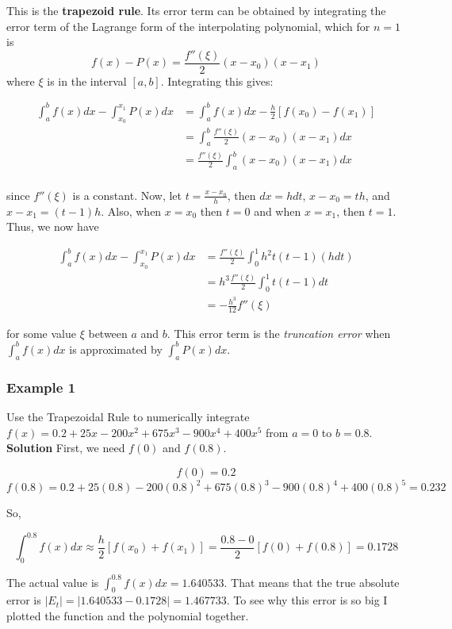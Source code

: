 \documentclass [titlepage,12pt,letter] {article}
\begin{document}
This is the {\bf trapezoid rule}. Its error term can be obtained by integrating the error term of the Lagrange form of the interpolating polynomial, which for $n=1$ is 
\[
f(x) - P(x) = \frac{f''(\xi)}{2}(x-x_0)(x-x_1) 
\]
\noindent 
\noindent 
where $\xi$ is in the interval $[a,b]$.
Integrating this gives: 

\begin{align*} 
\int_a^{b} f(x) dx - \int_{x_0}^{x_1} P(x)dx &= \int_a^{b} f(x) dx - \frac{h}{2} [ f(x_0) - f(x_1)] \\
&= \int_{a}^{b} \frac{f''(\xi)}{2}(x-x_0)(x-x_1)dx  \\
&= \frac{f''(\xi)}{2} \int_{a}^{b} (x-x_0)(x-x_1)dx \\ 
\end{align*} 

\noindent
since $f''(\xi)$ is a constant. Now, let $t = \frac{x-x_0}{h}$, then $dx=hdt$, $x - x_0 = th$, and $x - x_1 = (t-1) h$. 
Also, when $x=x_0$ then $t = 0$ and when $x = x_1$, then $t=1$. Thus, we now have

\begin{align*} 
\int_a^{b} f(x) dx - \int_{x_0}^{x_1} P(x)dx &= \frac{f''(\xi)}{2}\int_{0}^{1} h^2t(t-1)(hdt) \\
&= h^3 \frac{f''(\xi)}{2} \int_0^{1} t(t-1)dt \\ 
&= - \frac{h^3}{12}f''(\xi)
\end{align*} 

\noindent
for some value $\xi$ between $a$ and  $b$. This error term is the {\it truncation error} when $\int_a^b f(x) dx$ is approximated by $\int_a^{b} P(x)dx$. 

\subsubsection{Example 1} 

Use the Trapezoidal Rule to numerically integrate $f(x)=0.2+25x-200x^2+675x^3-900x^4+400x^5$ from $a=0$ to $b=0.8$. \\

{\bf Solution}
First, we need $f(0)$ and $f(0.8)$.

\[
f(0)=0.2
\]\[
f(0.8)=0.2+25(0.8)-200(0.8)^2+675(0.8)^3-900(0.8)^4+400(0.8)^5 = 0.232
\]

So,

\[
\int_0^{0.8}f(x)dx \approx \frac{h}{2}[f(x_0)+f(x_1)] = \frac{0.8-0}{2}[f(0)+f(0.8)] = 0.1728
\]

The actual value is $\int_0^{0.8}f(x)dx=1.640533$. That means that the true absolute error is $|E_t|=|1.640533-0.1728|=1.467733$. To see why this error is so big I plotted the function and the polynomial together.
\end{document}
